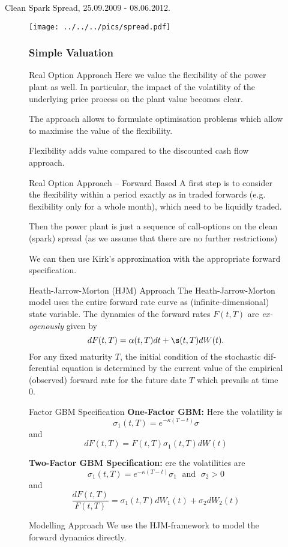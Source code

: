 Clean Spark Spread, 25.09.2009 - 08.06.2012. 
	\begin{figure}[htp]
	\centering
	\texttt{[image: ../../../pics/spread.pdf]}
	\label{spread}


\subsubsection{Simple Valuation}
Real Option Approach 
	Here we value the flexibility of the power plant as well. In particular,
	the impact of the volatility of the underlying price process on the
	plant value becomes clear. 

	The approach allows to formulate optimisation problems which allow
	to maximise the value of the flexibility. 

	Flexibility adds value compared to the discounted cash flow approach. 


Real Option Approach -- Forward Based 
	A first step is to consider the flexibility within a period exactly
	as in traded forwards (e.g. flexibility only for a whole month), which
	need to be liquidly traded. 

	Then the power plant is just a sequence of call-options on the clean
	(spark) spread (as we assume that there are no further restrictions) 

	We can then use Kirk's approximation with the appropriate forward
	specification. 


Heath-Jarrow-Morton (HJM) Approach
	The Heath-Jarrow-Morton model uses the entire forward rate curve as
	(infinite-dimensional) state variable. The dynamics of the forward
	rates $F(t,T)$ are \foreignlanguage{english}{\textit{exogenously}
	given by 
	$$
	dF(t,T)=\alpha(t,T)dt+\s(t,T)dW(t).
	$$
	For any fixed maturity $T$, the initial condition of the stochastic
	differential equation is determined by the current value of the empirical
	(observed) forward rate for the future date $T$ which prevails at
	time $0$.}


Factor GBM Specification 
	\textbf{One-Factor GBM:} Here the volatility is 
	$$
	\sigma_1(t,T)=e^{-\kappa (T-t)}\sigma
	$$
	and
	$$
	dF(t,T)=F(t,T)\sigma_1(t,T)dW(t)
	$$

	\textbf{Two-Factor GBM Specification:} 
	ere the volatilities are 
	$$
	\sigma_1(t,T)=e^{-\kappa (T-t)}\sigma_1 \; \mbox{ and } \; \sigma_2>0
	$$
	and
	$$
	\frac{dF(t,T)}{F(t,T)}=\sigma_1(t,T)dW_1(t)+\sigma_2dW_2(t)
	$$


Modelling Approach 
	We use the HJM-framework to model the forward dynamics directly. 


\end{figure}
